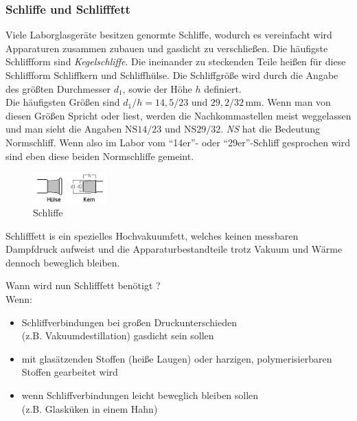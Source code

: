 \subsubsection*{Schliffe und Schlifffett}
\label{sec:normschliff}
Viele Laborglasgeräte besitzen genormte Schliffe, wodurch es vereinfacht wird Apparaturen zusammen zubauen und gasdicht zu verschließen. Die häufigste Schliffform sind \textit{Kegelschliffe}. Die ineinander zu steckenden Teile heißen für diese Schliffform Schliffkern und Schliffhülse.  Die Schliffgröße wird durch die Angabe des größten Durchmesser $d_1$, sowie der Höhe $h$ definiert.\\
Die häufigsten Größen sind $d_1/h = 14,5/23 \text{ und } 29,2/32 \, \si{\milli \meter}$. Wenn man von diesen Größen Spricht oder liest, werden die Nachkommastellen meist weggelassen und man sieht die Angaben $\text{NS}14/23$ und $\text{NS}29/32$. \textit{NS} hat die Bedeutung Normschliff. Wenn also im Labor vom "`14er"'- oder "`29er"'-Schliff gesprochen wird sind eben diese beiden Normschliffe gemeint.

\begin{figure}[h!]
	\centering
	\includegraphics[width=0.25\textwidth]{img/schliff}
	\caption{Schliffe}
	\label{fig:schliff}
\end{figure}
\FloatBarrier

Schlifffett is ein spezielles Hochvakuumfett, welches keinen messbaren Dampfdruck aufweist und die Apparaturbestandteile trotz Vakuum und Wärme dennoch beweglich bleiben. 

Wann wird nun Schlifffett benötigt ? \\
Wenn:
\begin{itemize}
	\item Schliffverbindungen bei großen Druckunterschieden \\ (z.B. Vakuumdestillation) gasdicht sein sollen
	\item mit glasätzenden Stoffen (heiße Laugen) oder harzigen, polymerisierbaren Stoffen gearbeitet wird
	\item wenn Schliffverbindungen leicht beweglich bleiben sollen \\(z.B. Glasküken in einem Hahn)
\end{itemize}

\\

